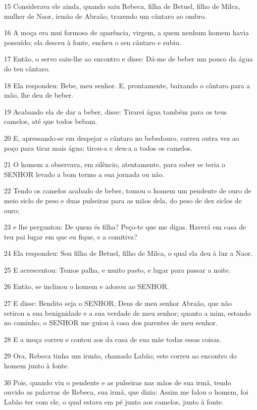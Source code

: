 \par 15 Considerava ele ainda, quando saiu Rebeca, filha de Betuel, filho de Milca, mulher de Naor, irmão de Abraão, trazendo um cântaro ao ombro.
\par 16 A moça era mui formosa de aparência, virgem, a quem nenhum homem havia possuído; ela desceu à fonte, encheu o seu cântaro e subiu.
\par 17 Então, o servo saiu-lhe ao encontro e disse: Dá-me de beber um pouco da água do teu cântaro.
\par 18 Ela respondeu: Bebe, meu senhor. E, prontamente, baixando o cântaro para a mão, lhe deu de beber.
\par 19 Acabando ela de dar a beber, disse: Tirarei água também para os teus camelos, até que todos bebam.
\par 20 E, apressando-se em despejar o cântaro no bebedouro, correu outra vez ao poço para tirar mais água; tirou-a e deu-a a todos os camelos.
\par 21 O homem a observava, em silêncio, atentamente, para saber se teria o SENHOR levado a bom termo a sua jornada ou não.
\par 22 Tendo os camelos acabado de beber, tomou o homem um pendente de ouro de meio siclo de peso e duas pulseiras para as mãos dela, do peso de dez siclos de ouro;
\par 23 e lhe perguntou: De quem és filha? Peço-te que me digas. Haverá em casa de teu pai lugar em que eu fique, e a comitiva?
\par 24 Ela respondeu: Sou filha de Betuel, filho de Milca, o qual ela deu à luz a Naor.
\par 25 E acrescentou: Temos palha, e muito pasto, e lugar para passar a noite.
\par 26 Então, se inclinou o homem e adorou ao SENHOR.
\par 27 E disse: Bendito seja o SENHOR, Deus de meu senhor Abraão, que não retirou a sua benignidade e a sua verdade de meu senhor; quanto a mim, estando no caminho, o SENHOR me guiou à casa dos parentes de meu senhor.
\par 28 E a moça correu e contou aos da casa de sua mãe todas essas coisas.
\par 29 Ora, Rebeca tinha um irmão, chamado Labão; este correu ao encontro do homem junto à fonte.
\par 30 Pois, quando viu o pendente e as pulseiras nas mãos de sua irmã, tendo ouvido as palavras de Rebeca, sua irmã, que dizia: Assim me falou o homem, foi Labão ter com ele, o qual estava em pé junto aos camelos, junto à fonte.
